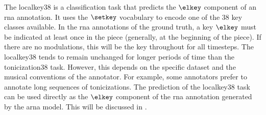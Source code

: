 
The \gls{localkey38} is a classification task that predicts
the $\elkey$ component of an \gls{rna} annotation. It uses
the $\setkey$ vocabulary to encode one of the 38 key classes
available. In the \gls{rna} annotations of the ground truth,
a key $\elkey$ must be indicated at least once in the piece
(generally, at the beginning of the piece). If there are no
modulations, this will be the key throughout for all
timesteps. The \gls{localkey38} tends to remain unchanged
for longer periods of time than the \gls{tonicization38}
task. However, this depends on the specific dataset and the
musical conventions of the annotator. For example, some
annotators prefer to annotate long sequences of
tonicizations. The prediction of the \gls{localkey38} task
can be used directly as the $\elkey$ component of the
\gls{rna} annotation generated by the \gls{arna} model. This
will be discussed in .


